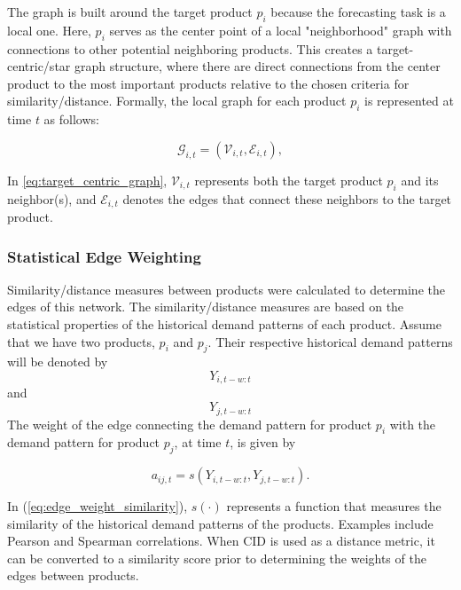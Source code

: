 \label{subsubsec:target_centric_topology} The graph is built around the target product $p_{i}$ because the forecasting task is a local one. Here, $p_{i}$ serves as the center point of a local "neighborhood" graph with connections to other potential neighboring products. This creates a target-centric/star graph structure, where there are direct connections from the center product to the most important products relative to the chosen criteria for similarity/distance. Formally, the local graph for each product $p_{i}$ is represented at time $ t $ as follows:

\begin{equation}
    \mathcal{G}_{i,t} = \left(\mathcal{V}_{i,t}, \mathcal{E}_{i,t}\right),
    \label{eq:target_centric_graph}
\end{equation}

In \ref{eq:target_centric_graph}, $\mathcal{V}_{i,t}$ represents both the target product $p_{i}$ and its neighbor(s), and $\mathcal{E}_{i,t}$ denotes the edges that connect these neighbors to the target product.



\subsubsection{Statistical Edge Weighting}
\label{subsubsec:statistical_edge_weights}

Similarity/distance measures between products were calculated to determine the edges of this network. The similarity/distance measures are based on the statistical properties of the historical demand patterns of each product. Assume that we have two products, $p_i$ and $p_j$. Their respective historical demand patterns will be denoted by $$Y_{i,t-w:t}$$ and $$Y_{j,t-w:t}$$ The weight of the edge connecting the demand pattern for product $p_i$ with the demand pattern for product $p_j$, at time $t$, is given by

\begin{equation}
a_{ij,t}=s\left(Y_{i,t-w:t}, Y_{j,t-w:t}\right).
\label{eq:edge_weight_similarity}
\end{equation}

In (\ref{eq:edge_weight_similarity}), $s(\cdot)$ represents a function that measures the similarity of the historical demand patterns of the products. Examples include Pearson and Spearman correlations. When CID is used as a distance metric, it can be converted to a similarity score prior to determining the weights of the edges between products.

